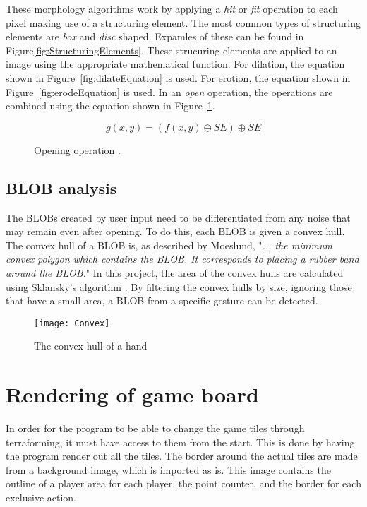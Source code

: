 These morphology algorithms work by applying a \textit{hit} or \textit{fit} operation to each pixel making use of a structuring element. The most common types of structuring elements are \textit{box} and \textit{disc} shaped. Expamles of these can be found in Figure\ref{fig:StructuringElements}. These strucuring elements are applied to an image using the appropriate mathematical function. For dilation, the equation shown in Figure~\ref{fig:dilateEquation} is used. For erotion, the equation shown in Figure~\ref{fig:erodeEquation} is used. In an \textit{open} operation, the operations are combined using the equation shown in Figure~\ref{fig:openingEquation}.

\begin{figure}[!h]
	\centering
	\begin{displaymath}
	g(x, y) = (f(x, y) \ominus SE) \oplus SE
	\end{displaymath}
	\caption{Opening operation \citep{moeslund_introduction_2012}. \label{fig:openingEquation}}
\end{figure}

\subsection{BLOB analysis}

The BLOBs created by user input need to be differentiated from any noise that may remain even after opening. To do this, each BLOB is given a convex hull. The convex hull of a BLOB is, as described by Moeslund, "\textit{... the minimum convex polygon which contains the BLOB. It corresponds to placing a rubber band around the BLOB.}" \citep{moeslund_introduction_2012} In this project, the area of the convex hulls are calculated using Sklansky's algorithm \citep{Sklansky198279}. By filtering the convex hulls by size, ignoring those that have a small area, a BLOB from a specific gesture can be detected.
\begin{figure}[h!]
\begin{center}
\texttt{[image: Convex]}
\end{center}
\caption{The convex hull of a hand \label{Fig:Convex}}
\end{figure}

\section{Rendering of game board}


In order for the program to be able to change the game tiles through terraforming, it must have access to them from the start. This is done by having the program render out all the tiles. The border around the actual tiles are made from a background image, which is imported as is. This image contains the outline of a player area for each player, the point counter, and the border for each exclusive action. 

